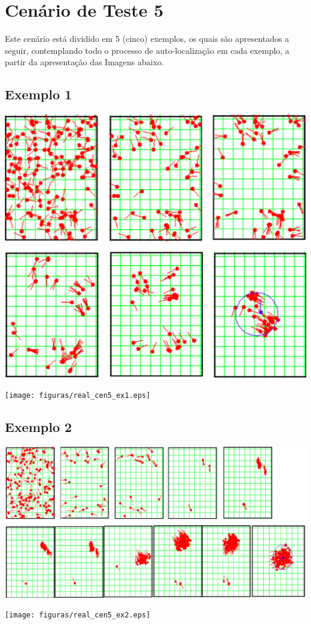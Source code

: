 \section{Cenário de Teste 5}

Este cenário está dividido em 5 (cinco) exemplos, os quais são apresentados a seguir, contemplando todo o processo de auto-localização
em cada exemplo, a partir da apresentação das Imagens abaixo.

\subsection{Exemplo 1}

{\centering
\includegraphics[scale=0.4]{figuras/cen5_ex1.eps}
\label{img:cen5_ex1}
\par}

{\centering
\texttt{[image: figuras/real\_cen5\_ex1.eps]}
\label{img:real_cen5_ex1}
\par}

\subsection{Exemplo 2}

{\centering
\includegraphics[scale=0.4]{figuras/cen5_ex2.eps}
\label{img:cen5_ex2}
\par}

{\centering
\texttt{[image: figuras/real\_cen5\_ex2.eps]}
\label{img:real_cen5_ex2}
\par}
